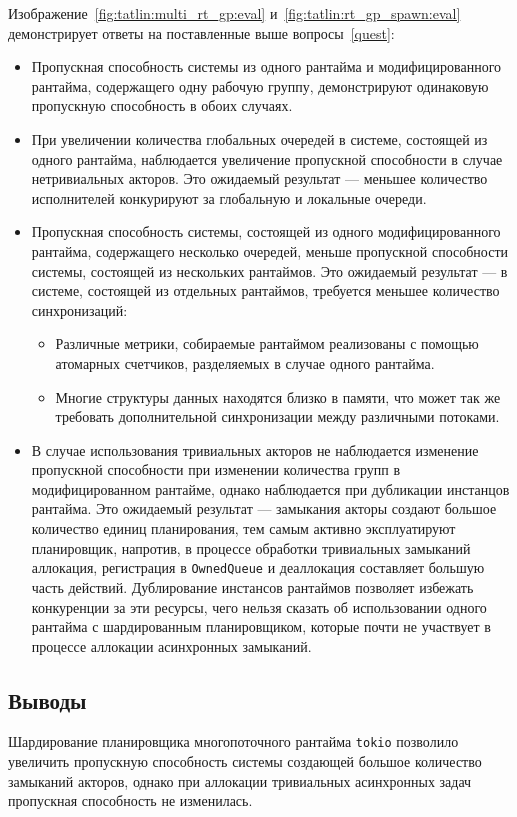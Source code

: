 Изображение~\ref{fig:tatlin:multi_rt_gp:eval} и~\ref{fig:tatlin:rt_gp_spawn:eval} демонстрирует ответы на поставленные выше вопросы~\ref{quest}:

\begin{itemize}
    \item Пропускная способность системы из одного рантайма и модифицированного рантайма, содержащего одну рабочую группу, демонстрируют одинаковую пропускную способность в обоих случаях.
    \item При увеличении количества глобальных очередей в системе, состоящей из одного рантайма, наблюдается увеличение пропускной способности в случае нетривиальных акторов. Это ожидаемый результат --- меньшее количество исполнителей конкурируют за глобальную и локальные очереди.
    \item Пропускная способность системы, состоящей из одного модифицированного рантайма, содержащего несколько очередей, меньше пропускной способности системы, состоящей из нескольких рантаймов. Это ожидаемый результат --- в системе, состоящей из отдельных рантаймов, требуется меньшее количество синхронизаций:
    \begin{itemize}
        \item Различные метрики, собираемые рантаймом реализованы с помощью атомарных счетчиков, разделяемых в случае одного рантайма.
        \item Многие структуры данных находятся близко в памяти, что может так же требовать дополнительной синхронизации между различными потоками.
    \end{itemize}
    \item В случае использования тривиальных акторов не наблюдается изменение пропускной способности при изменении количества групп в модифицированном рантайме, однако наблюдается при дубликации инстанцов рантайма. Это ожидаемый результат --- замыкания акторы создают большое количество единиц планирования, тем самым активно эксплуатируют планировщик, напротив, в процессе обработки тривиальных замыканий аллокация, регистрация в \verb|OwnedQueue| и деаллокация составляет большую часть действий. Дублирование инстансов рантаймов позволяет избежать конкуренции за эти ресурсы, чего нельзя сказать об использовании одного рантайма с шардированным планировщиком, которые почти не участвует в процессе аллокации асинхронных замыканий.
\end{itemize}

\subsection{Выводы}

Шардирование планировщика многопоточного рантайма \verb|tokio| позволило увеличить пропускную способность системы создающей большое количество замыканий акторов, однако при аллокации тривиальных асинхронных задач пропускная способность не изменилась.
